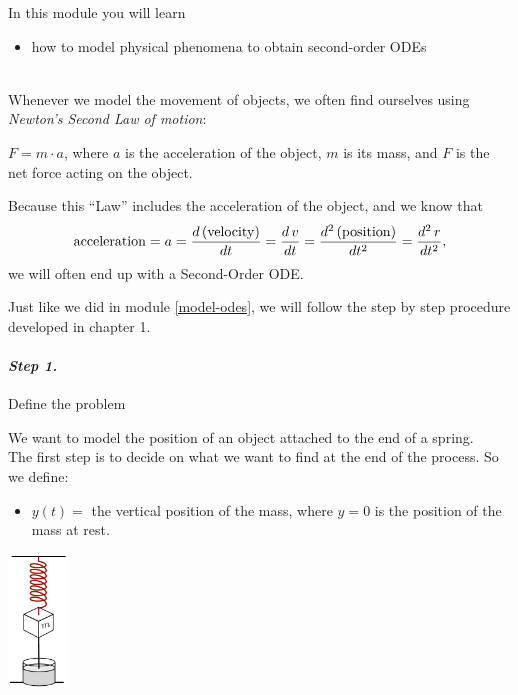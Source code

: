 In this module you will learn
\begin{itemize}
	\item how to model physical phenomena to obtain second-order ODEs
\end{itemize}

\hfill \\


Whenever we model the movement of objects, we often find ourselves using \emph{Newton's Second Law of motion}:

\begin{definition}
	$F = m \cdot a$, \quad
	where $a$ is the acceleration of the object, $m$ is its mass, and $F$ is the net force acting on the object.
\end{definition}

Because this ``Law'' includes the acceleration of the object, and we know that
$$
{\rm acceleration} = a = \frac{d\,({\rm velocity})}{dt} = \frac{d\,v}{dt} = \frac{d^2 \, ({\rm position})}{dt^2} = \frac{d^2\,r}{dt^2},
$$
we will often end up with a Second-Order ODE.

Just like we did in module \ref{model-odes}, we will follow the step by step procedure developed in chapter 1.

\paragraph{\emph{Step 1.}} Define the problem

\begin{example}

\begin{minipage}{.75\textwidth}
We want to model the position of an object attached to the end of a spring. \\

The first step is to decide on what we want to find at the end of the process. 
So we define:
\begin{itemize}
	\item $y(t) =$ the vertical position of the mass, where $y=0$ is the position of the mass at rest.
\end{itemize}
\end{minipage}
\hfill
\begin{minipage}{44pt}
\includegraphics*[height=100pt]{images/module15-spring-mass-dashpot.pdf}	
\end{minipage}
\end{example}


